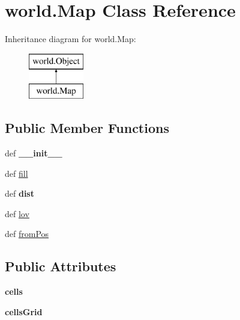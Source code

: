 \hypertarget{classworld_1_1_map}{\section{world.\-Map \-Class \-Reference}
\label{classworld_1_1_map}
}
\-Inheritance diagram for world.\-Map\-:\begin{figure}[H]
\begin{center}
\leavevmode
\includegraphics[height=2.000000cm]{classworld_1_1_map}
\end{center}
\end{figure}
\subsection*{\-Public \-Member \-Functions}
\begin{DoxyCompactItemize}
\item 
\hypertarget{classworld_1_1_map_aabfde95675f6b82d9a8afcd676053632}{def {\bfseries \-\_\-\-\_\-init\-\_\-\-\_\-}}\label{classworld_1_1_map_aabfde95675f6b82d9a8afcd676053632}

\item 
def \hyperlink{classworld_1_1_map_ac8e650b696f537d9df20ee5d2243e978}{fill}
\item 
\hypertarget{classworld_1_1_map_ac5f255ae58db6b391d0a3d5807365370}{def {\bfseries dist}}\label{classworld_1_1_map_ac5f255ae58db6b391d0a3d5807365370}

\item 
def \hyperlink{classworld_1_1_map_a7b1d3e4419fd5bd48d5f759e63ae55f5}{lov}
\item 
def \hyperlink{classworld_1_1_map_a12e89884cc3e9da4d024575a85b1d324}{from\-Pos}
\end{DoxyCompactItemize}
\subsection*{\-Public \-Attributes}
\begin{DoxyCompactItemize}
\item 
\hypertarget{classworld_1_1_map_af412cfb2a5b25f4ca3188498f916a647}{{\bfseries cells}}\label{classworld_1_1_map_af412cfb2a5b25f4ca3188498f916a647}

\item 
\hypertarget{classworld_1_1_map_aec6e18657e8d65b1ab57cdf305e2de37}{{\bfseries cells\-Grid}}\label{classworld_1_1_map_aec6e18657e8d65b1ab57cdf305e2de37}

\end{DoxyCompactItemize}



